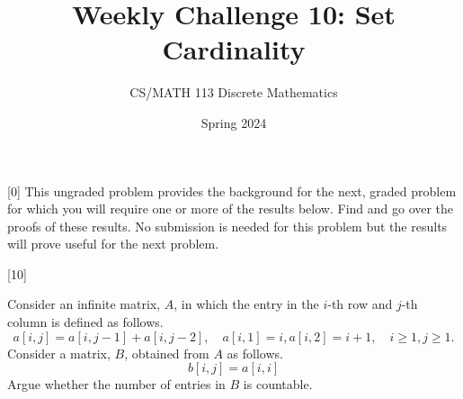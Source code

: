 \documentclass[a4paper]{exam}
\title{Weekly Challenge 10: Set Cardinality}
\author{CS/MATH 113 Discrete Mathematics}
\date{Spring 2024}
\begin{document}
\maketitle

\begin{questions}

[0]
  This ungraded problem provides the background for the next, graded problem for which you will require one or more of the results below. Find and go over the proofs of these results. No submission is needed for this problem but the results will prove useful for the next problem.
  


[10]

  Consider an infinite matrix, $A$, in which the entry in the $i$-th row and $j$-th column is defined as follows.
  \[
    a[i,j] = a[i,j-1] + a[i,j-2], \quad a[i,1] = i, a[i,2] = i+1, \quad i\geq 1, j\geq 1.
  \]
  Consider a matrix, $B$, obtained from $A$ as follows.
  \[
    b[i,j]= a[i,i]
  \]
  Argue whether the number of entries in $B$ is countable.
  
    \begin{solution}


\end{solution}
\end{questions}
\end{document}
